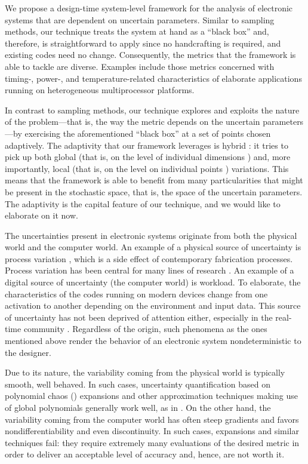 We propose a design-time system-level framework for the analysis of electronic
systems that are dependent on uncertain parameters. Similar to sampling methods,
our technique treats the system at hand as a ``black box'' and, therefore, is
straightforward to apply since no handcrafting is required, and existing codes
need no change. Consequently, the metrics that the framework is able to tackle
are diverse. Examples include those metrics concerned with timing-, power-, and
temperature-related characteristics of elaborate applications running on
heterogeneous multiprocessor platforms.

In contrast to sampling methods, our technique explores and exploits the nature
of the problem---that is, the way the metric depends on the uncertain
parameters---by exercising the aforementioned ``black box'' at a set of points
chosen adaptively. The adaptivity that our framework leverages is hybrid
\cite{jakeman2012}: it tries to pick up both global (that is, on the level of
individual dimensions \cite{klimke2006}) and, more importantly, local (that is,
on the level on individual points \cite{ma2009}) variations. This means that the
framework is able to benefit from many particularities that might be present in
the stochastic space, that is, the space of the uncertain parameters. The
adaptivity is the capital feature of our technique, and we would like to
elaborate on it now.

The uncertainties present in electronic systems originate from both the physical
world and the computer world. An example of a physical source of uncertainty is
process variation \cite{srivastava2005}, which is a side effect of contemporary
fabrication processes. Process variation has been central for many lines of
research \cite{bhardwaj2008, juan2012, lee2013, ukhov2014, ukhov2015}. An
example of a digital source of uncertainty (the computer world) is workload. To
elaborate, the characteristics of the codes running on modern devices change
from one activation to another depending on the environment and input data. This
source of uncertainty has not been deprived of attention either, especially in
the real-time community \cite{quinton2012, diaz2002, santinelli2011,
tanasa2015}. Regardless of the origin, such phenomena as the ones mentioned
above render the behavior of an electronic system nondeterministic to the
designer.


Due to its nature, the variability coming from the physical world is typically
smooth, well behaved. In such cases, uncertainty quantification based on
polynomial chaos () expansions \cite{xiu2010} and other approximation
techniques making use of global polynomials generally work well, as in
\cite{bhardwaj2008, lee2013, ukhov2014, ukhov2015}. On the other hand, the
variability coming from the computer world has often steep gradients and favors
nondifferentiability and even discontinuity. In such cases,  expansions
and similar techniques fail: they require extremely many evaluations of the
desired metric in order to deliver an acceptable level of accuracy and, hence,
are not worth it.

